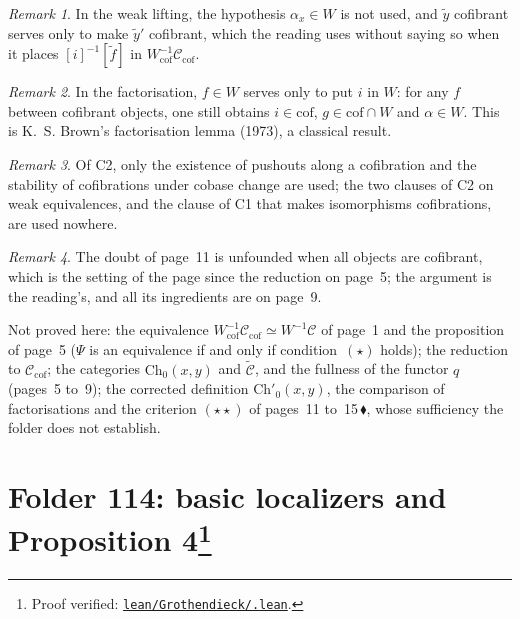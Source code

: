 \documentclass[11pt]{article}
\newcommand{\verifie}[1]{\footnote{Proof verified: \href{https://github.com/Commutator-IO/grothendieck-project/blob/article-lean-2026-10/lean/Grothendieck/#1.lean}{\texttt{lean/Grothendieck/\detokenize{#1}.lean}}.}}
\newcommand{\piste}[1]{\,\href{https://grothendieck.commutator.io/findings/\##1}{\textcolor{piste}{\ensuremath{\blacklozenge}}}}
\theoremstyle{plain}
\theoremstyle{definition}
\theoremstyle{remark}
\newtheorem*{remarque}{Remark}
\begin{document}
\begin{remarque}
In the weak lifting, the hypothesis $\alpha_x \in W$ is not used, and $\widetilde y$ cofibrant serves only to make $\widetilde y'$ cofibrant, which the reading uses without saying so when it places $[i]^{-1}[\widetilde f]$ in $W_{\mathrm{cof}}^{-1}\mathcal C_{\mathrm{cof}}$.
\end{remarque}

\begin{remarque}
In the factorisation, $f \in W$ serves only to put $i$ in $W$: for any $f$ between cofibrant objects, one still obtains $i \in \mathrm{cof}$, $g \in \mathrm{cof} \cap W$ and $\alpha \in W$. This is K.~S. Brown's factorisation lemma (1973), a classical result.
\end{remarque}

\begin{remarque}
Of C2, only the existence of pushouts along a cofibration and the stability of cofibrations under cobase change are used; the two clauses of C2 on weak equivalences, and the clause of C1 that makes isomorphisms cofibrations, are used nowhere.
\end{remarque}

\begin{remarque}
The doubt of page~11 is unfounded when all objects are cofibrant, which is the setting of the page since the reduction on page~5; the argument is the reading's, and all its ingredients are on page~9.
\end{remarque}

\noindent Not proved here: the equivalence $W_{\mathrm{cof}}^{-1}\mathcal C_{\mathrm{cof}} \simeq W^{-1}\mathcal C$ of page~1 and the proposition of page~5 ($\Psi$ is an equivalence if and only if condition~$(\star)$ holds); the reduction to $\mathcal C_{\mathrm{cof}}$; the categories $\mathrm{Ch}_0(x, y)$ and $\widetilde{\mathcal C}$, and the fullness of the functor $q$ (pages~5 to~9); the corrected definition $\mathrm{Ch}'_0(x, y)$, the comparison of factorisations and the criterion $(\star\star)$ of pages~11 to~15\piste{106-section-criterion-span-faithfulness}, whose sufficiency the folder does not establish.

\section[Folder 114: basic localizers and Proposition 4]{Folder 114: basic localizers and Proposition 4\protect\verifie{Folder114}}\label{sec:114}
\end{document}
